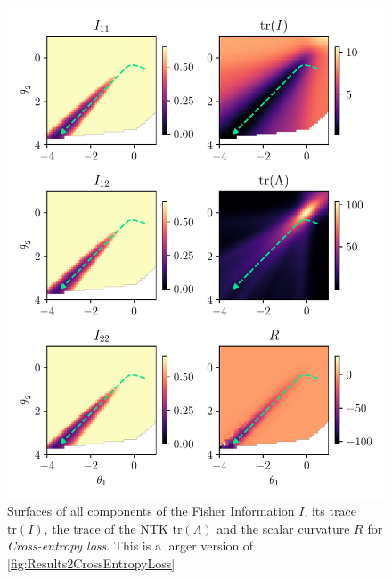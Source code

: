 \begin{figure}
	\centering
	\includegraphics{Experiment2/plots/CrossEntropyLoss_tracecomparison_Big.pdf}
	\caption{Surfaces of all components of the Fisher Information $I$, its trace $\mathrm{tr}(I)$, the trace of the NTK $\mathrm{tr}(\Lambda)$ and the scalar curvature $R$ for \emph{Cross-entropy loss}. This is a larger version of \cref{fig:Results2CrossEntropyLoss}}
	\label{fig:Results2CrossEntropyLossBig}
\end{figure}
